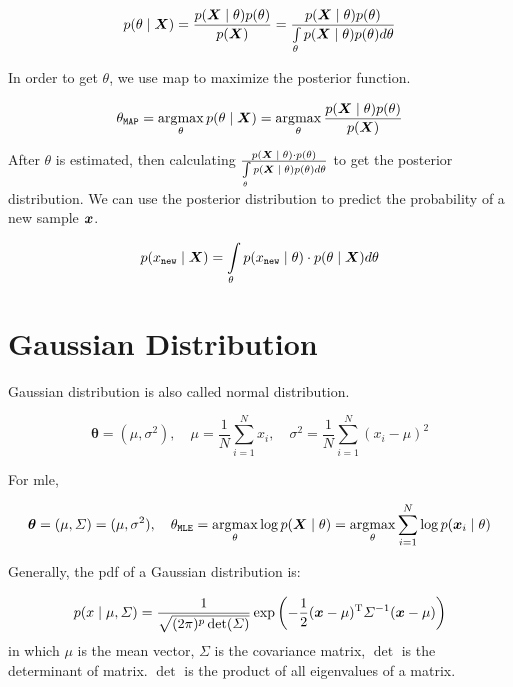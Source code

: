 \begin{equation}
	p\giventhat{\theta}{\vX} = \frac{p\giventhat{\vX}{\theta} p(\theta)}{p(\vX)}  =  \frac{p\giventhat{\vX}{\theta} p(\theta)}{\int\limits_{\theta} p\giventhat{\vX}{\theta} p(\theta) d\theta}
\end{equation}


In order to get \(\theta\), we use \gls{map}  to maximize the posterior function.

\begin{equation}
	\theta_{\mathtt{MAP}} = \argmax_{\theta} p\giventhat{\theta}{\vX} = \argmax_{\theta} \frac{p\giventhat{\vX}{\theta} p(\theta)}{p(\vX)}
\end{equation}


After \(\theta\) is estimated, then  calculating \(\frac{p\giventhat{\vX}{\theta} \cdot p(\theta)}{\int\limits_{\theta} p\giventhat{\vX}{\theta} p(\theta) d\theta}\) to get the posterior distribution.
We can use the posterior distribution to predict the probability of a new sample \(\vx\).


\begin{equation}
	p \giventhat{x_{\mathtt{new}}}{\vX}  = \int\limits_{\theta} p\giventhat{x_{\mathtt{new}}}{\theta} \cdot p\giventhat{\theta}{\vX} d\theta
\end{equation}

\section{Gaussian Distribution}

Gaussian distribution is also called normal distribution.

\begin{equation}
	\boldsymbol{\theta} = (\mu, \sigma^2), \quad \mu = \frac{1}{N} \sum_{i=1}^{N} x_i, \quad \sigma^2 = \frac{1}{N} \sum_{i=1}^{N} (x_i - \mu)^2
\end{equation}

For \gls{mle},

\begin{equation}
	\boldsymbol{\theta} = (\mu, \Sigma) = (\mu, \sigma^2), \quad \theta_{\mathtt{MLE}} = \argmax_{\theta} \log p\giventhat{\vX}{\theta} = \argmax_{\theta} \sum_{i=1}^{N} \log p\giventhat{\vx_i}{\theta}
\end{equation}


Generally, the \gls{pdf} of a Gaussian distribution is:

\begin{equation}
	p\giventhat{x}{\mu, \Sigma} =  \frac{1}{\sqrt{(2\pi)^p \det(\Sigma)}} \exp\left(-\frac{1}{2} (\vx - \mu)\transp \Sigma^{-1} (\vx - \mu)\right)
\end{equation}
in which \(\mu\) is the mean vector, \(\Sigma\) is the covariance matrix, \(\det\) is the determinant of matrix.
\(\det\)  is the product of all eigenvalues of a matrix.

